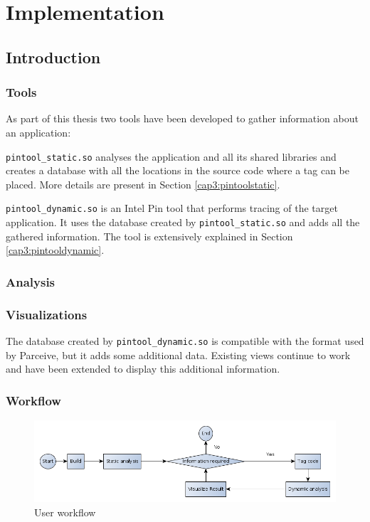 \chapter{Implementation}

\section{Introduction}

\subsection{Tools}

As part of this thesis two tools have been developed to gather information about an application:

\texttt{pintool\_static.so} analyses the application and all its shared libraries and creates a database with all the locations in the source code where a tag can be placed. More details are present in Section \ref{cap3:pintoolstatic}.

\texttt{pintool\_dynamic.so} is an Intel Pin tool that performs tracing of the target application. It uses the database created by \texttt{pintool\_static.so} and adds all the gathered information. The tool is extensively explained in Section \ref{cap3:pintooldynamic}.

\subsection{Analysis}


\subsection{Visualizations}

The database created by \texttt{pintool\_dynamic.so} is compatible with the format used by Parceive, but it adds some additional data. Existing views continue to work and have been extended to display this additional information.

\subsection{Workflow}

\begin{figure}
	\centering
	\includegraphics[width=1\textwidth]{workflow}
	\caption{User workflow}
	\label{cap3:workflow}
\end{figure}

